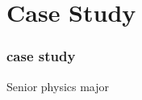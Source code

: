\section{Case Study}
\begin{comment}
* Cases
** Case study: Scientific Computing (we know this target exists)
*** Target user: a senior physics major who knows some C, and wants to either 1) contribute to a project or 2) do some research and feed it back into a community
*** Write wiki articles instead of writing a paper.
*** http://www.scipy.org/Getting_Started
*** http://www.opensourcephysics.org/
**** Extend with projects that run on the EC2 compute cloud / GPGPUs
*** Automation of experiments / Arduino
\end{comment}



\begin{frame} 
\frametitle{case study}
\huge
\begin{center}
Senior physics major
\end{center}
\end{frame} 



\begin{comment}
\begin{frame} 
\frametitle{What could this student do?}
\begin{itemize}
	\item Search: "Scientific computing"
	\item http://www.scipy.org/Getting_Started
	\item http://www.opensourcephysics.org
	\item Write wiki articles instead of writing a paper.
	\item Extend to EC2 and GPGPUs
	\item Automation of experiments (Arduino?)
	\item other ideas?
\end{itemize}
\end{frame}
\end{comment}
